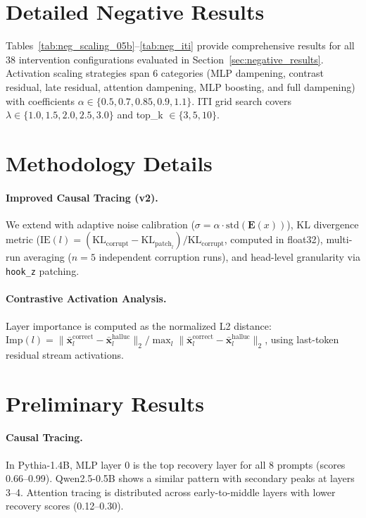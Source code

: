 \documentclass[11pt]{article}
\begin{document}
\section{Detailed Negative Results}
\label{app:negative_results}

Tables~\ref{tab:neg_scaling_05b}--\ref{tab:neg_iti} provide comprehensive results for all 38 intervention configurations evaluated in Section~\ref{sec:negative_results}. Activation scaling strategies span 6 categories (MLP dampening, contrast residual, late residual, attention dampening, MLP boosting, and full dampening) with coefficients $\alpha \in \{0.5, 0.7, 0.85, 0.9, 1.1\}$. ITI grid search covers $\lambda \in \{1.0, 1.5, 2.0, 2.5, 3.0\}$ and top\_k $\in \{3, 5, 10\}$.

\section{Methodology Details}
\label{app:methods}

\paragraph{Improved Causal Tracing (v2).} We extend \citet{meng2022locating} with adaptive noise calibration ($\sigma = \alpha \cdot \text{std}(\mathbf{E}(x))$), KL divergence metric ($\text{IE}(l) = (\text{KL}_{\text{corrupt}} - \text{KL}_{\text{patch}_l}) / \text{KL}_{\text{corrupt}}$, computed in float32), multi-run averaging ($n{=}5$ independent corruption runs), and head-level granularity via \texttt{hook\_z} patching.

\paragraph{Contrastive Activation Analysis.} Layer importance is computed as the normalized L2 distance: $\text{Imp}(l) = \| \bar{\mathbf{x}}_l^{\text{correct}} - \bar{\mathbf{x}}_l^{\text{halluc}} \|_2 / \max_l \| \bar{\mathbf{x}}_l^{\text{correct}} - \bar{\mathbf{x}}_l^{\text{halluc}} \|_2$, using last-token residual stream activations.

\section{Preliminary Results}
\label{app:preliminary}

\paragraph{Causal Tracing.} In Pythia-1.4B, MLP layer 0 is the top recovery layer for all 8 prompts (scores 0.66--0.99). Qwen2.5-0.5B shows a similar pattern with secondary peaks at layers 3--4. Attention tracing is distributed across early-to-middle layers with lower recovery scores (0.12--0.30).
\end{document}
